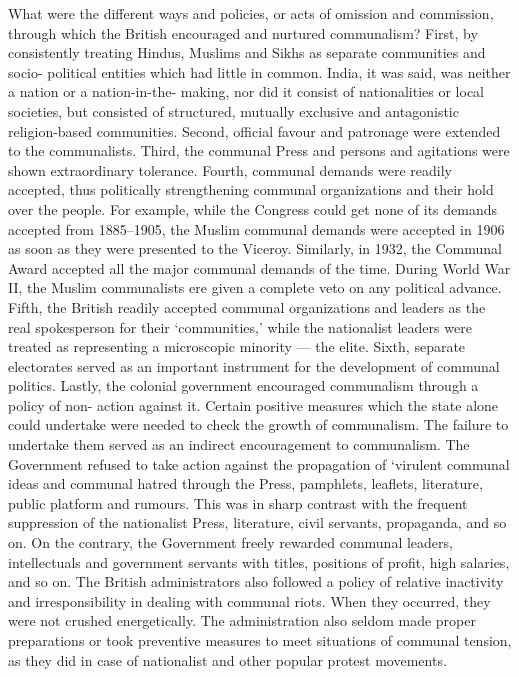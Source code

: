 What were the different ways and policies, or acts of omission and commission, through which the British encouraged and nurtured communalism? First, by consistently treating Hindus, Muslims and Sikhs as separate communities and socio- political entities which had little in common. India, it was said, was neither a nation or a nation-in-the- making, nor did it consist of nationalities or local societies, but consisted of structured, mutually exclusive and antagonistic religion-based communities. Second, official favour and patronage were extended to the communalists. Third, the communal Press and persons and agitations were shown extraordinary tolerance. Fourth, communal demands were readily accepted, thus politically strengthening communal organizations and their hold over the people. For example, while the Congress could get none of its demands accepted from 1885--1905, the Muslim communal demands were accepted in 1906 as soon as they were presented to the Viceroy. Similarly, in 1932, the Communal Award accepted all the major communal demands of the time. During World War II, the Muslim communalists ere given a complete veto on any political advance. Fifth, the British readily accepted communal organizations and leaders as the real spokesperson for their `communities,' while the nationalist leaders were treated as representing a microscopic minority --- the elite. Sixth, separate electorates served as an important instrument for the development of communal politics. Lastly, the colonial government encouraged communalism through a policy of non- action against it. Certain positive measures which the state alone could undertake were needed to check the growth of communalism. The failure to undertake them served as an indirect encouragement to communalism. The Government refused to take action against the propagation of `virulent communal ideas and communal hatred through the Press, pamphlets, leaflets, literature, public platform and rumours. This was in sharp contrast with the frequent suppression of the nationalist Press, literature, civil servants, propaganda, and so on. On the contrary, the Government freely rewarded communal leaders, intellectuals and government servants with titles, positions of profit, high salaries, and so on. The British administrators also followed a policy of relative inactivity and irresponsibility in dealing with communal riots. When they occurred, they were not crushed energetically. The administration also seldom made proper preparations or took preventive measures to meet situations of communal tension, as they did in case of nationalist and other popular protest movements. 

